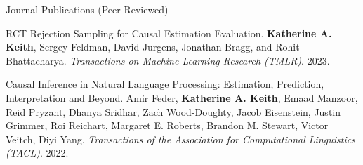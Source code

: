 \documentclass{resume} %
\begin{document}
%
\begin{rSection}{Journal Publications (Peer-Reviewed)}
\begin{etaremune}


\item RCT Rejection Sampling for Causal Estimation Evaluation. 
\textbf{Katherine A. Keith}, Sergey Feldman, David Jurgens, Jonathan Bragg, and Rohit Bhattacharya.
\emph{Transactions on Machine Learning Research (TMLR)}. 2023.  


\item Causal Inference in Natural Language Processing: Estimation, Prediction, Interpretation and Beyond. Amir Feder, \textbf{Katherine A. Keith}, Emaad Manzoor, Reid Pryzant, Dhanya Sridhar, Zach Wood-Doughty, Jacob Eisenstein, Justin Grimmer, Roi Reichart, Margaret E. Roberts, Brandon M. Stewart, Victor Veitch, Diyi Yang.
\emph{Transactions of the Association for Computational Linguistics (TACL)}. 2022.  

\end{etaremune}
\end{rSection}
\end{document}
